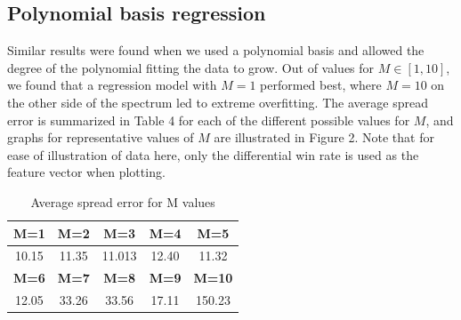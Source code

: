 \documentclass{article}
\begin{document}
\subsection{Polynomial basis regression}

Similar results were found when we used a polynomial basis and allowed the degree of the polynomial fitting the data to grow. Out of values for $M \in [1, 10]$, we found that a regression model with $M=1$ performed best, where $M=10$ on the other side of the spectrum led to extreme overfitting. The average spread error is summarized in Table 4 for each of the different possible values for $M$, and graphs for representative values of $M$ are illustrated in Figure 2. Note that for ease of illustration of data here, only the differential win rate is used as the feature vector when plotting.

\begin{table}
  \begin{center}
    \begin{tabular}{ | c | c | c | c | c | }
      \hline
      \textbf{M=1}    & \textbf{M=2}    & \textbf{M=3}     & \textbf{M=4}     & \textbf{M=5}      \\ \hline
      10.15  & 11.35  & 11.013  & 12.40   & 11.32    \\ \hline \hline
      \textbf{M=6}    & \textbf{M=7}    & \textbf{M=8}     & \textbf{M=9}     & \textbf{M=10}     \\ \hline
      12.05  & 33.26  & 33.56   & 17.11   & 150.23   \\ \hline
    \end{tabular}
  \end{center}
  \caption{Average spread error for M values}
\end{table}
\end{document}
